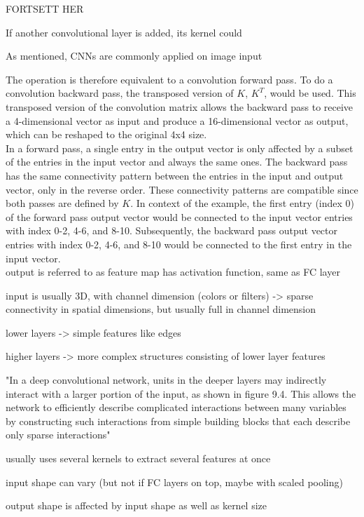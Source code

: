 FORTSETT HER

If another convolutional layer is added, its kernel could 

As mentioned, CNNs are commonly applied on image input

The operation is therefore equivalent to a convolution forward pass. To do a convolution backward pass, the transposed version of $K$, $K^T$, would be used. This transposed version of the convolution matrix allows the backward pass to receive a 4-dimensional vector as input and produce a 16-dimensional vector as output, which can be reshaped to the original 4x4 size. \\

\noindent In a forward pass, a single entry in the output vector is only affected by a subset of the entries in the input vector and always the same ones. The backward pass has the same connectivity pattern between the entries in the input and output vector, only in the reverse order. These connectivity patterns are compatible since both passes are defined by $K$. In context of the example, the first entry (index 0) of the forward pass output vector would be connected to the input vector entries with index 0-2, 4-6, and 8-10. Subsequently, the backward pass output vector entries with index 0-2, 4-6, and 8-10 would be connected to the first entry in the input vector.\\

output is referred to as feature map
has activation function, same as FC layer


input is usually 3D, with channel dimension (colors or filters) -> sparse connectivity in spatial dimensions, but usually full in channel dimension

lower layers -> simple features like edges

higher layers -> more complex structures consisting of lower layer features

"In a deep convolutional network,
units in the deeper layers may indirectly interact with a larger portion of the input,
as shown in figure 9.4. This allows the network to efficiently describe complicated
interactions between many variables by constructing such interactions from simple
building blocks that each describe only sparse interactions"

usually uses several kernels to extract several features at once

input shape can vary (but not if FC layers on top, maybe with scaled pooling)

output shape is affected by input shape as well as kernel size

